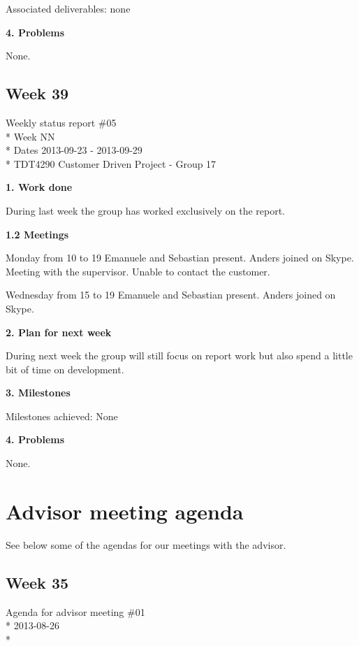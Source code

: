 Associated deliverables: none


\textbf{4. Problems}

None.


\newpage
\subsection{Week 39}

\begin{center}
Weekly status report \#05\\*
Week NN \\*
Dates 2013-09-23 - 2013-09-29 \\*
TDT4290 Customer Driven Project - Group 17
\end{center}

\textbf{1. Work done}

During last week the group has worked exclusively on the report.

\textbf{1.2 Meetings}

Monday from 10 to 19
Emanuele and Sebastian present. Anders joined on Skype.
Meeting with the supervisor. Unable to contact the customer.

Wednesday from 15 to 19
Emanuele and Sebastian present. Anders joined on Skype.


\textbf{2. Plan for next week}

During next week the group will still focus on report work but also spend a little bit of time on development.

\textbf{3. Milestones}

Milestones achieved: None

\textbf{4. Problems}

None.

\fi





\clearpage
\section{Advisor meeting agenda}

See below some of the agendas for our meetings with the advisor.

\subsection{Week 35}

\begin{center}
Agenda for advisor meeting \#01\\*
2013-08-26\\*
\end{center}

